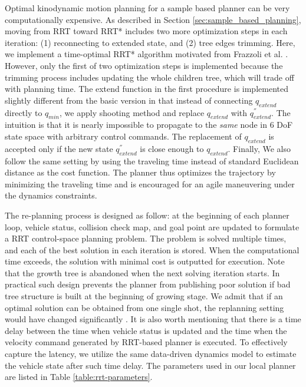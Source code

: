 \documentclass[../thesis.tex]{subfiles}
\begin{document}
Optimal kinodynamic motion planning for a sample based planner can be very computationally expensive.
As described in Section \ref{sec:sample_based_planning}, moving from RRT toward RRT* includes two more optimization steps in each iteration: (1) reconnecting to extended state, and (2) tree edges trimming. 
Here, we implement a time-optimal RRT* algorithm motivated from Frazzoli et al. \cite{hwan2011anytime}. 
However, only the first of two optimization steps is implemented because the trimming process includes updating the whole children tree, which will trade off with planning time. 
The extend function in the first procedure is implemented slightly different from the basic version in that instead of connecting $q_{extend}$ directly to $q_{min}$, we apply shooting method and replace $q_{extend}$ with $q^{''}_{extend}$. 
The intuition is that it is nearly impossible to propagate to the \textit{same} node in 6 DoF state space with arbitrary control commands. 
The replacement of $q_{extend}$ is accepted only if the new state $q^{''}_{extend}$ is close enough to $q_{extend}$. 
Finally, We also follow the same setting by using the traveling time instead of standard Euclidean distance as the cost function. 
The planner thus optimizes the trajectory by minimizing the traveling time and is encouraged for an agile maneuvering under the dynamics constraints.

The re-planning process is designed as follow: at the beginning of each planner loop, vehicle status, collision check map, and goal point are updated to formulate a RRT control-space planning problem. 
The problem is solved multiple times, and each of the best solution in each iteration is stored.
When the computational time exceeds, the solution with minimal cost is outputted for execution. 
Note that the growth tree is abandoned when the next solving iteration starts. 
In practical such design prevents the planner from publishing poor solution if bad tree structure is built at the beginning of growing stage. 
We admit that if an optimal solution can be obtained from one single shot, the replanning setting would have changed significantly \cite{ferguson2006replanning}. 
It is also worth mentioning that there is a time delay between the time when vehicle status is updated and the time when the velocity command generated by RRT-based planner is executed. 
To effectively capture the latency, we utilize the same data-driven dynamics model to estimate the vehicle state after such time delay. 
The parameters used in our local planner are listed in Table \ref{table:rrt-parameters}. 
\end{document}

